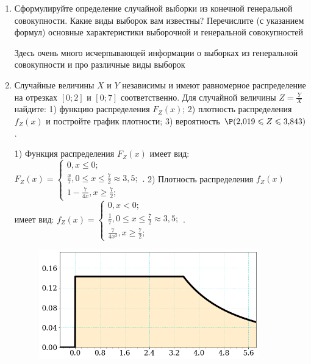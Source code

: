 \documentclass[a4paper,14pt]{article}
\begin{document}
\begin{enumerate}


\item


Сформулируйте определение случайной выборки из конечной генеральной совокупности. Какие
виды выборок вам известны? Перечислите (с указанием формул) основные характеристики выборочной и генеральной совокупностей




Здесь очень много исчерпывающей информации о выборках из генеральной совокупности и про различные виды выборок


\item



Случайные величины $X$ и $Y$ независимы и имеют равномерное
распределение на отрезках $[0;2]$ и $[0;7]$ соответственно. Для случайной величины $Z=\frac{Y}{X}$ найдите: 
1) функцию распределения $F_Z(x)$;
2) плотность распределения $f_Z(x)$ и постройте график плотности;
3) вероятность $\P(2,\!019\leqslant Z\leqslant 3,\!843)$.




1) Функция распределения $F_Z(x)$ имеет вид:
$
F_Z(x)=\left\{
\begin{array}{l}
0, x\leqslant 0;\\
\frac{x}{7}, 0\leqslant x\leqslant \frac{7}{2}\approx 3,\!5;\\
1 - \frac{7}{4 x}, x\geqslant\frac{7}{2};
\end{array}.
\right.
$
2) Плотность распределения $f_Z(x)$ имеет вид:
$
f_Z(x)=\left\{
\begin{array}{l}
0, x<0;\\
\frac{1}{7}, 0\leqslant x\leqslant \frac{7}{2}\approx 3,\!5;\\
\frac{7}{4 x^{2}}, x\geqslant\frac{7}{2};
\end{array}.
\right.
$


\begin{figure}[H]
    \includegraphics[width=0.9\textwidth]{2_53d15}
\end{figure}



\end{enumerate}
\end{document}
